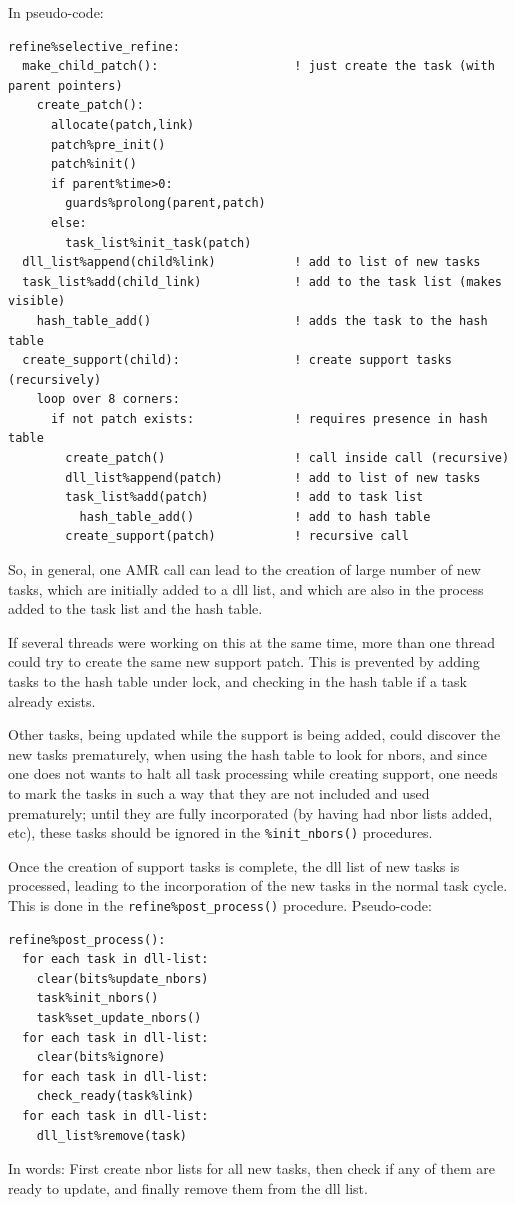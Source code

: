 \documentclass[paper=a4,fontsize=11pt]{scrartcl}
\numberwithin{equation}{section}		%
\numberwithin{figure}{section}			%
\numberwithin{table}{section}				%
\newcommand{\codecolor}{\color{Blue}}
\begin{document}
In pseudo-code:
{\small\codecolor\begin{verbatim}
refine%selective_refine:
  make_child_patch():                   ! just create the task (with parent pointers)
    create_patch():
      allocate(patch,link)
      patch%pre_init()
      patch%init()
      if parent%time>0:
        guards%prolong(parent,patch)
      else:
        task_list%init_task(patch)
  dll_list%append(child%link)           ! add to list of new tasks
  task_list%add(child_link)             ! add to the task list (makes visible)
    hash_table_add()                    ! adds the task to the hash table
  create_support(child):                ! create support tasks (recursively)
    loop over 8 corners:
      if not patch exists:              ! requires presence in hash table
        create_patch()                  ! call inside call (recursive)
        dll_list%append(patch)          ! add to list of new tasks
        task_list%add(patch)            ! add to task list
          hash_table_add()              ! add to hash table
        create_support(patch)           ! recursive call
\end{verbatim}}
So, in general, one AMR call can lead to the creation of large number of new tasks, which are initially added to a dll list, and which are also in the process added to the task list and the hash table.

If several threads were working on this at the same time, more than one thread could try to create the same new support patch.  This is prevented by adding tasks to the hash table under lock, and checking in the hash table if a task already exists.

Other tasks, being updated while the support is being added, could discover the new tasks prematurely, when using the hash table to look for nbors, and since one does not wants to halt all task processing while creating support, one needs to mark the tasks in such a way that they are not included and used prematurely; until they are fully incorporated (by having had nbor lists added, etc), these tasks should be ignored in the \verb|%init_nbors()| procedures.

Once the creation of support tasks is complete, the dll list of new tasks is processed, leading to the incorporation of the new tasks in the normal task cycle.  This is done in the \verb|refine%post_process()| procedure.  Pseudo-code:
{\small\codecolor\begin{verbatim}
refine%post_process():
  for each task in dll-list:
    clear(bits%update_nbors)
    task%init_nbors()
    task%set_update_nbors()
  for each task in dll-list:
    clear(bits%ignore)
  for each task in dll-list:
    check_ready(task%link)
  for each task in dll-list:
    dll_list%remove(task)
\end{verbatim}}
In words:  First create nbor lists for all new tasks, then check if any of them are ready to update, and finally remove them from the dll list.
\end{document}
